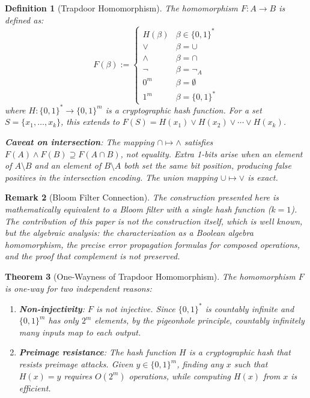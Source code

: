 \documentclass[10pt,conference]{IEEEtran}
\newtheorem{theorem}{Theorem}
\newtheorem{definition}[theorem]{Definition}
\newtheorem{remark}[theorem]{Remark}
\begin{document}
\begin{definition}[Trapdoor Homomorphism]
The homomorphism $F : A \to B$ is defined as:
$$F(\beta) := \begin{cases}
    H(\beta)       & \beta \in \{0,1\}^* \\
    \lor           & \beta = \cup \\
    \land          & \beta = \cap \\
    \neg           & \beta = \neg_A \\
    0^m            & \beta = \emptyset \\
    1^m            & \beta = \{0,1\}^*
\end{cases}$$
where $H: \{0,1\}^* \to \{0,1\}^m$ is a cryptographic hash function. For a set $S = \{x_1, \ldots, x_k\}$, this extends to $F(S) = H(x_1) \lor H(x_2) \lor \cdots \lor H(x_k)$.

\textbf{Caveat on intersection}: The mapping $\cap \mapsto \land$ satisfies $F(A) \land F(B) \supseteq F(A \cap B)$, not equality. Extra 1-bits arise when an element of $A \setminus B$ and an element of $B \setminus A$ both set the same bit position, producing false positives in the intersection encoding. The union mapping $\cup \mapsto \lor$ is exact.
\end{definition}

\begin{remark}[Bloom Filter Connection]
\label{rem:bloom-filter}
The construction presented here is mathematically equivalent to a Bloom filter with a single hash function ($k=1$). The contribution of this paper is not the construction itself, which is well known, but the algebraic analysis: the characterization as a Boolean algebra homomorphism, the precise error propagation formulas for composed operations, and the proof that complement is not preserved.
\end{remark}

\begin{theorem}[One-Wayness of Trapdoor Homomorphism]
\label{thm:one-way}
The homomorphism $F$ is one-way for two independent reasons:
\begin{enumerate}
\item \textbf{Non-injectivity}: $F$ is not injective. Since $\{0,1\}^*$ is countably infinite and $\{0,1\}^m$ has only $2^m$ elements, by the pigeonhole principle, countably infinitely many inputs map to each output.
\item \textbf{Preimage resistance}: The hash function $H$ is a cryptographic hash that resists preimage attacks. Given $y \in \{0,1\}^m$, finding any $x$ such that $H(x) = y$ requires $O(2^m)$ operations, while computing $H(x)$ from $x$ is efficient.
\end{enumerate}
\end{theorem}
\end{document}
